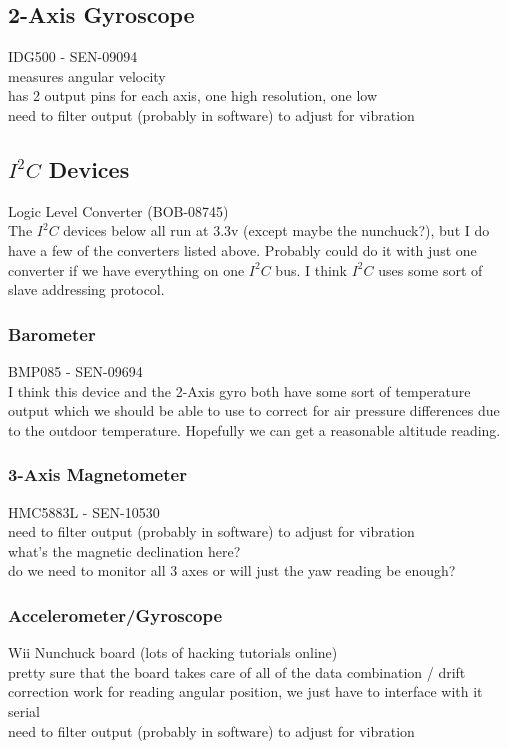 \documentclass{article}
\begin{document}
\subsection{2-Axis Gyroscope}
IDG500 - SEN-09094\\
measures angular velocity\\
has 2 output pins for each axis, one high resolution, one low\\
need to filter output (probably in software) to adjust for vibration\\

\subsection{$I^2C$ Devices}
Logic Level Converter (BOB-08745)\\
The $I^2C$ devices below all run at 3.3v (except maybe the nunchuck?), but I do have a few of the 
converters listed above.  Probably could do it with just one converter if we have everything on one $I^2C$ bus.  I think $I^2C$ uses some sort of slave addressing protocol.

\subsubsection{Barometer}
BMP085 - SEN-09694\\
I think this device and the 2-Axis gyro both have some sort of temperature output which we should be able to use to correct for air pressure differences due to the outdoor temperature.  Hopefully we can get a reasonable altitude reading.

\subsubsection{3-Axis Magnetometer}
HMC5883L - SEN-10530\\
need to filter output (probably in software) to adjust for vibration\\
what's the magnetic declination here?\\
do we need to monitor all 3 axes or will just the yaw reading be enough?\\

\subsubsection{Accelerometer/Gyroscope}
Wii Nunchuck board (lots of hacking tutorials online)\\
pretty sure that the board takes care of all of the data combination / drift correction work for reading angular position, we just have to interface with it serial\\
need to filter output (probably in software) to adjust for vibration\\
\end{document}
